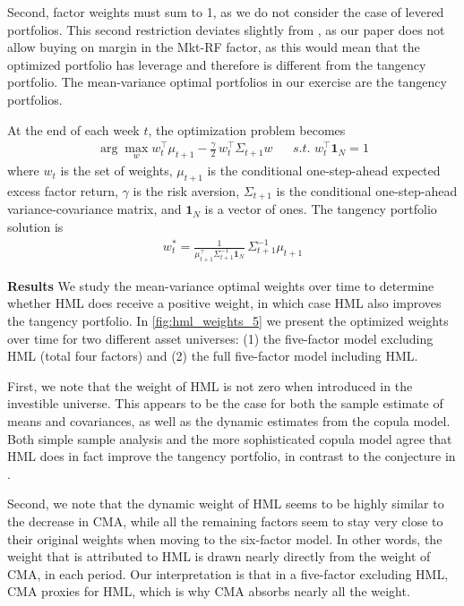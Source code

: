Second, factor weights must sum to 1, as we do not consider the case of levered portfolios. This second restriction deviates slightly from \textcite{ChristoffersenLanglois2013}, as our paper does not allow buying on margin in the Mkt-RF factor, as this would mean that the optimized portfolio has leverage and therefore is different from the tangency portfolio. The mean-variance optimal portfolios in our exercise are the tangency portfolios.

At the end of each week $t$, the optimization problem becomes
\begin{align}
	\arg\!\max_{w} w_t^\top \mu_{t+1} - \frac{\gamma}{2}\,w_t^\top \Sigma_{t+1} w && s.t.\,\,w_t^\top \mathbf{1}_N = 1
\end{align}
where $w_t$ is the set of weights, $\mu_{t+1}$ is the conditional one-step-ahead expected excess factor return, $\gamma$ is the risk aversion, $\Sigma_{t+1}$ is the conditional one-step-ahead variance-covariance matrix, and $\mathbf{1}_N$ is a vector of ones. The tangency portfolio solution is
\begin{align}
    w_t^* = \frac{1}{\mu_{t+1}^\top \Sigma_{t+1}^{-1} \mathbf{1}_N} \, \Sigma_{t+1}^{-1} \mu_{t+1}
\end{align}

\textbf{Results}
We study the mean-variance optimal weights over time to determine whether HML does receive a positive weight, in which case HML also improves the tangency portfolio. In \autoref{fig:hml_weights_5} we present the optimized weights over time for two different asset universes: (1) the five-factor model excluding HML (total four factors) and (2) the full five-factor model including HML. 

First, we note that the weight of HML is not zero when introduced in the investible universe. This appears to be the case for both the sample estimate of means and covariances, as well as the dynamic estimates from the copula model. Both simple sample analysis and the more sophisticated copula model agree that HML does in fact improve the tangency portfolio, in contrast to the conjecture in \textcite{FF2015}.

Second, we note that the dynamic weight of HML seems to be highly similar to the decrease in CMA, while all the remaining factors seem to stay very close to their original weights when moving to the six-factor model. In other words, the weight that is attributed to HML is drawn nearly directly from the weight of CMA, in each period. Our interpretation is that in a five-factor excluding HML, CMA proxies for HML, which is why CMA absorbs nearly all the weight.

